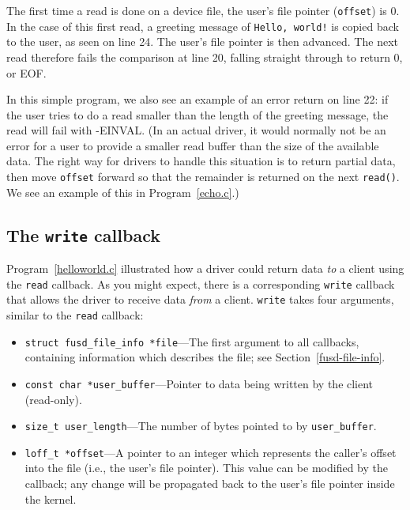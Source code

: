 \documentclass{article}
\begin{document}
The first time a read is done on a device file, the user's file
pointer ({\tt *offset}) is 0.  In the case of this first read, a
greeting message of {\tt Hello, world!} is copied back to the user, as
seen on line 24.  The user's file pointer is then advanced.  The next
read therefore fails the comparison at line 20, falling straight
through to return 0, or EOF.

In this simple program, we also see an example of an error return on
line 22: if the user tries to do a read smaller than the length of the
greeting message, the read will fail with -EINVAL.  (In an actual
driver, it would normally not be an error for a user to provide a
smaller read buffer than the size of the available data.  The right
way for drivers to handle this situation is to return partial data,
then move {\tt *offset} forward so that the remainder is returned on
the next {\tt read()}.  We see an example of this in
Program~\ref{echo.c}.)

\subsection{The {\tt write} callback}

Program~\ref{helloworld.c} illustrated how a driver could return data
{\em to} a client using the {\tt read} callback.  As you might expect, there
is a corresponding {\tt write} callback that allows the driver to
receive data {\em from} a client.  {\tt write} takes four arguments,
similar to the {\tt read} callback:

\begin{itemize}
\item {\tt struct fusd\_file\_info *file}---The first argument to all
callbacks, containing information which describes the file; see
Section~\ref{fusd-file-info}.
\item {\tt const char *user\_buffer}---Pointer to data being written
by the client (read-only).
\item {\tt size\_t user\_length}---The number of bytes pointed to by
{\tt user\_buffer}.
\item {\tt loff\_t *offset}---A pointer to an integer which represents
the caller's offset into the file (i.e., the user's file pointer).
This value can be modified by the callback; any change will be
propagated back to the user's file pointer inside the kernel.
\end{itemize}
\end{document}
